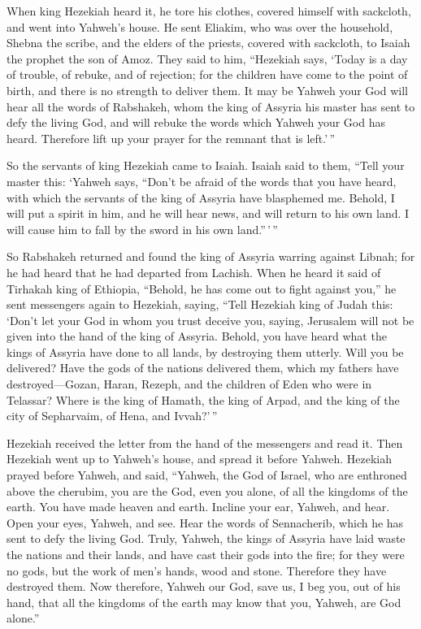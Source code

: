  When king Hezekiah heard it, he tore his clothes, covered
himself with sackcloth, and went into Yahweh's house.  He
sent Eliakim, who was over the household, Shebna the scribe, and the
elders of the priests, covered with sackcloth, to Isaiah the prophet the
son of Amoz.  They said to him, ``Hezekiah says, `Today is
a day of trouble, of rebuke, and of rejection; for the children have
come to the point of birth, and there is no strength to deliver them.
 It may be Yahweh your God will hear all the words of
Rabshakeh, whom the king of Assyria his master has sent to defy the
living God, and will rebuke the words which Yahweh your God has heard.
Therefore lift up your prayer for the remnant that is left.'\,''

 So the servants of king Hezekiah came to Isaiah.
 Isaiah said to them, ``Tell your master this: `Yahweh
says, ``Don't be afraid of the words that you have heard, with which the
servants of the king of Assyria have blasphemed me. 
Behold, I will put a spirit in him, and he will hear news, and will
return to his own land. I will cause him to fall by the sword in his own
land.''\,'\,''

 So Rabshakeh returned and found the king of Assyria
warring against Libnah; for he had heard that he had departed from
Lachish.  When he heard it said of Tirhakah king of
Ethiopia, ``Behold, he has come out to fight against you,'' he sent
messengers again to Hezekiah, saying,  ``Tell Hezekiah
king of Judah this: `Don't let your God in whom you trust deceive you,
saying, Jerusalem will not be given into the hand of the king of
Assyria.  Behold, you have heard what the kings of
Assyria have done to all lands, by destroying them utterly. Will you be
delivered?  Have the gods of the nations delivered them,
which my fathers have destroyed---Gozan, Haran, Rezeph, and the children
of Eden who were in Telassar?  Where is the king of
Hamath, the king of Arpad, and the king of the city of Sepharvaim, of
Hena, and Ivvah?'\,''

 Hezekiah received the letter from the hand of the
messengers and read it. Then Hezekiah went up to Yahweh's house, and
spread it before Yahweh.  Hezekiah prayed before Yahweh,
and said, ``Yahweh, the God of Israel, who are enthroned above the
cherubim, you are the God, even you alone, of all the kingdoms of the
earth. You have made heaven and earth.  Incline your ear,
Yahweh, and hear. Open your eyes, Yahweh, and see. Hear the words of
Sennacherib, which he has sent to defy the living God. 
Truly, Yahweh, the kings of Assyria have laid waste the nations and
their lands,  and have cast their gods into the fire; for
they were no gods, but the work of men's hands, wood and stone.
Therefore they have destroyed them.  Now therefore,
Yahweh our God, save us, I beg you, out of his hand, that all the
kingdoms of the earth may know that you, Yahweh, are God alone.''


